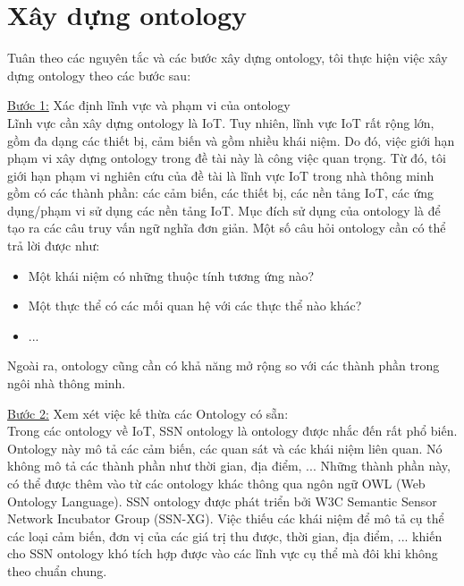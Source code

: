 \section{Xây dựng ontology}
Tuân theo các nguyên tắc và các bước xây dựng ontology, tôi thực hiện việc xây dựng ontology theo các bước sau:

\underline{Bước 1:} Xác định lĩnh vực và phạm vi của ontology \\
Lĩnh vực cần xây dựng ontology là IoT. Tuy nhiên, lĩnh vực IoT rất rộng lớn, gồm đa dạng các thiết bị, cảm biến và gồm nhiều khái niệm. Do đó, việc giới hạn phạm vi xây dựng ontology trong đề tài này là công việc quan trọng. Từ đó, tôi giới hạn phạm vi nghiên cứu của đề tài là lĩnh vực IoT trong nhà thông minh gồm có các thành phần: các cảm biến, các thiết bị, các nền tảng IoT, các ứng dụng/phạm vi sử dụng các nền tảng IoT. 
Mục đích sử dụng của ontology là để tạo ra các câu truy vấn ngữ nghĩa đơn giản. Một số câu hỏi ontology cần có thể trả lời được như:
\begin{itemize}
	\item Một khái niệm có những thuộc tính tương ứng nào?
	\item Một thực thể có các mối quan hệ với các thực thể nào khác?
	\item ...
\end{itemize}
Ngoài ra, ontology cũng cần có khả năng mở rộng so với các thành phần trong ngôi nhà thông minh. 

\underline{Bước 2:} Xem xét việc kế thừa các Ontology có sẵn: \\
Trong các ontology về IoT, SSN ontology là ontology được nhắc đến rất phổ biến. Ontology này mô tả các cảm biến, các quan sát và các khái niệm liên quan. Nó không mô tả các thành phần như thời gian, địa điểm, ... Những thành phần này, có thể được thêm vào từ các ontology khác thông qua ngôn ngữ OWL (Web Ontology Language).
SSN ontology được phát triển bởi W3C Semantic Sensor Network Incubator Group (SSN-XG). Việc thiếu các khái niệm để mô tả cụ thể các loại cảm biến, đơn vị của các giá trị thu được, thời gian, địa điểm, ... khiến cho SSN ontology khó tích hợp được vào các lĩnh vực cụ thể mà đôi khi không theo chuẩn chung.

